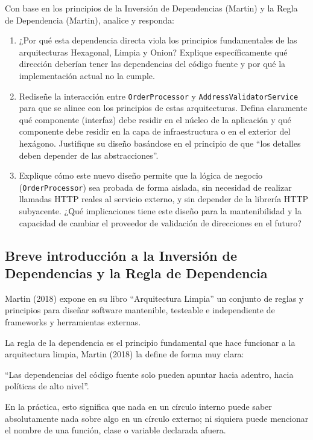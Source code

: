\documentclass[12pt, a4paper]{article}
\begin{document}
        Con base en los principios de la Inversión de Dependencias (Martin) y la Regla de Dependencia (Martin), analice y responda:

        \begin{enumerate}[label=\alph*)]
            \item ¿Por qué esta dependencia directa viola los principios fundamentales de las arquitecturas Hexagonal, Limpia y Onion? Explique específicamente qué dirección deberían tener las dependencias del código fuente y por qué la implementación actual no la cumple.

            \item Rediseñe la interacción entre \texttt{OrderProcessor} y \texttt{AddressValidatorService} para que se alinee con los principios de estas arquitecturas. Defina claramente qué componente (interfaz) debe residir en el núcleo de la aplicación y qué componente debe residir en la capa de infraestructura o en el exterior del hexágono. Justifique su diseño basándose en el principio de que ``los detalles deben depender de las abstracciones''.

            \item Explique cómo este nuevo diseño permite que la lógica de negocio (\texttt{OrderProcessor}) sea probada de forma aislada, sin necesidad de realizar llamadas HTTP reales al servicio externo, y sin depender de la librería HTTP subyacente. ¿Qué implicaciones tiene este diseño para la mantenibilidad y la capacidad de cambiar el proveedor de validación de direcciones en el futuro?
        \end{enumerate}

        \subsection{Breve introducción a la Inversión de Dependencias y la Regla de Dependencia}
        
        Martin (2018) expone en su libro ``Arquitectura Limpia'' un conjunto de reglas y principios para diseñar software mantenible, testeable e independiente de frameworks y herramientas externas.

        La regla de la dependencia es el principio fundamental que hace funcionar a la arquitectura limpia, Martin (2018) la define de forma muy clara:

        ``Las dependencias del código fuente solo pueden apuntar hacia adentro, hacia políticas de alto nivel''.

        En la práctica, esto significa que nada en un círculo interno puede saber absolutamente nada sobre algo en un círculo externo; ni siquiera puede mencionar el nombre de una función, clase o variable declarada afuera.
\end{document}
